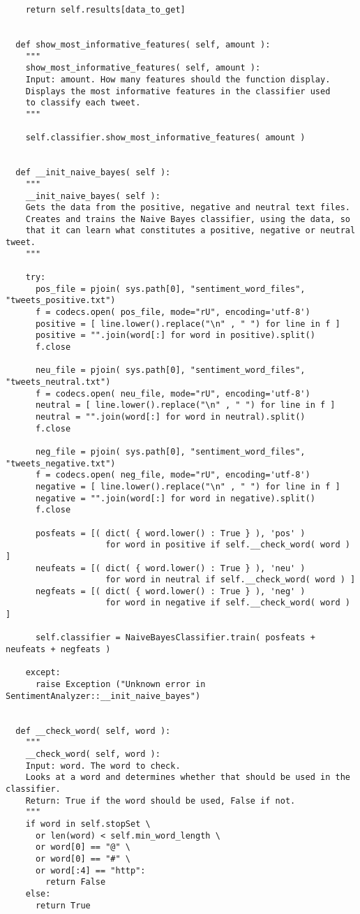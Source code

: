 \begin{verbatim}
    return self.results[data_to_get]


  def show_most_informative_features( self, amount ):
    """
    show_most_informative_features( self, amount ):
    Input: amount. How many features should the function display.
    Displays the most informative features in the classifier used
    to classify each tweet.
    """

    self.classifier.show_most_informative_features( amount )


  def __init_naive_bayes( self ):
    """
    __init_naive_bayes( self ):
    Gets the data from the positive, negative and neutral text files.
    Creates and trains the Naive Bayes classifier, using the data, so 
    that it can learn what constitutes a positive, negative or neutral tweet.
    """

    try:
      pos_file = pjoin( sys.path[0], "sentiment_word_files", "tweets_positive.txt")
      f = codecs.open( pos_file, mode="rU", encoding='utf-8')
      positive = [ line.lower().replace("\n" , " ") for line in f ]
      positive = "".join(word[:] for word in positive).split()
      f.close

      neu_file = pjoin( sys.path[0], "sentiment_word_files", "tweets_neutral.txt")
      f = codecs.open( neu_file, mode="rU", encoding='utf-8')
      neutral = [ line.lower().replace("\n" , " ") for line in f ]
      neutral = "".join(word[:] for word in neutral).split()
      f.close

      neg_file = pjoin( sys.path[0], "sentiment_word_files", "tweets_negative.txt")
      f = codecs.open( neg_file, mode="rU", encoding='utf-8')
      negative = [ line.lower().replace("\n" , " ") for line in f ]
      negative = "".join(word[:] for word in negative).split()
      f.close

      posfeats = [( dict( { word.lower() : True } ), 'pos' ) 
                    for word in positive if self.__check_word( word ) ]
      neufeats = [( dict( { word.lower() : True } ), 'neu' ) 
                    for word in neutral if self.__check_word( word ) ]
      negfeats = [( dict( { word.lower() : True } ), 'neg' ) 
                    for word in negative if self.__check_word( word ) ]

      self.classifier = NaiveBayesClassifier.train( posfeats + neufeats + negfeats )

    except:
      raise Exception ("Unknown error in SentimentAnalyzer::__init_naive_bayes")
  
  
  def __check_word( self, word ):
    """
    __check_word( self, word ):
    Input: word. The word to check.
    Looks at a word and determines whether that should be used in the classifier.
    Return: True if the word should be used, False if not.
    """
    if word in self.stopSet \
      or len(word) < self.min_word_length \
      or word[0] == "@" \
      or word[0] == "#" \
      or word[:4] == "http":
        return False
    else:
      return True









\end{verbatim}
